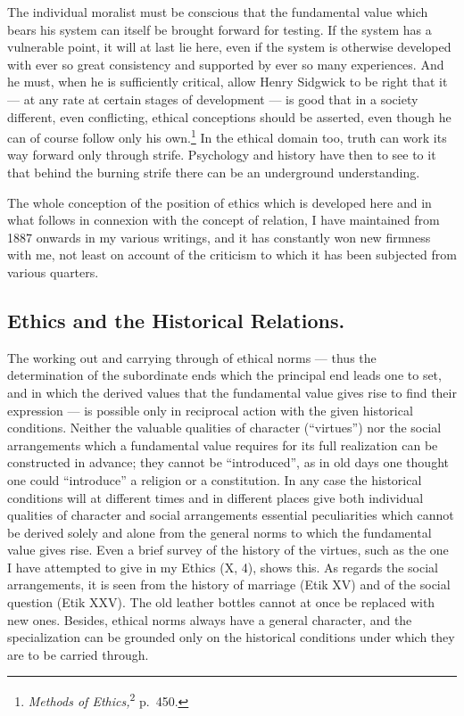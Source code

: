 \documentclass[12pt]{article}
\newcommand{\opage}[1]{\marginnote{\footnotesize\textit{[#1]}}}
\begin{document}
The individual moralist must be conscious that the fundamental value which
bears his system can itself be brought forward for testing. If the system
has a vulnerable point, it will at last lie here, even if the system is
otherwise developed with ever so great consistency and supported by ever so
many experiences. And he must, when he is sufficiently critical, allow Henry
Sidgwick to be right that it --- at any rate at certain stages of
development --- is good that in a society different, even conflicting,
ethical conceptions should be asserted, even though he can of course follow
only his own.\footnote{\textit{Methods of Ethics,}\textsuperscript{2}
p.~450.} In the ethical domain too, truth can work its way forward only
through strife. Psychology and history have then to \opage{87}see to it that behind
the burning strife there can be an underground understanding.

The whole conception of the position of ethics which is developed here and
in what follows in connexion with the concept of relation, I have maintained
from 1887 onwards in my various writings, and it has constantly won new
firmness with me, not least on account of the criticism to which it has been
subjected from various quarters.

\subsection{Ethics and the Historical Relations.}
\label{sec:4c}

\noindent The working out and carrying through of ethical norms --- thus the
determination of the subordinate ends which the principal end leads one to
set, and in which the derived values that the fundamental value gives rise
to find their expression --- is possible only in reciprocal action with the
given historical conditions. Neither the valuable qualities of character
(``virtues'') nor the social arrangements which a fundamental value requires
for its full realization can be constructed in advance; they cannot be
``introduced'', as in old days one thought one could ``introduce'' a
religion or a constitution. In any case the historical conditions will at
different times and in different places give both individual qualities of
character and social arrangements essential peculiarities which cannot be
derived solely and alone from the general norms to which the fundamental
value gives rise. Even a brief survey of the history of the virtues, such as
the one I have attempted to give in my Ethics (X, 4), shows this. As regards
the social arrangements, it is seen from the history of marriage (Etik XV)
and of the social question (Etik XXV). The old leather bottles cannot at
once be replaced with new ones. Besides, ethical norms always have a general
character, and the specialization can be grounded only on the historical
conditions under which they are to be carried through.
\end{document}
